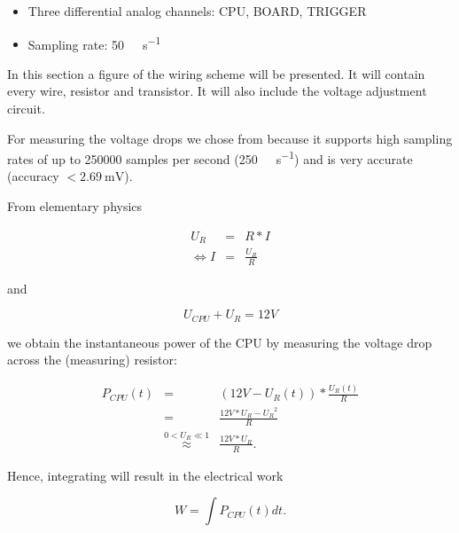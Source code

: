\begin{itemize}

\item Three differential analog channels: CPU, BOARD, TRIGGER

\item Sampling rate: \SI{50}{\kilo\samples\per\second}

\end{itemize}



In this section a figure of the wiring scheme will be presented. It will contain
every wire, resistor and transistor. It will also include the voltage adjustment
circuit.


\label{sec:measuring-device}

For measuring the voltage drops we chose
from  because it supports
high sampling rates of up to 250000 samples per second
(\SI{250}{\kilo\samples\per\second}) and is very
accurate (accuracy $< \SI{2.69}{\milli\volt}$)\cite{NISpec2009}.


\label{sec:calc-work}

From elementary physics

\begin{eqnarray}
     U_R & = & R * I \\
  \iff I & = & \frac{U_R}{R}
\end{eqnarray}

and

\begin{equation}
  U_{CPU} + U_{R} = 12 V
\end{equation}

we obtain the instantaneous power of the CPU by measuring the voltage drop
across the (measuring) resistor:

\begin{eqnarray}
P_{CPU}(t) & = & (12V - U_R(t)) * \frac{U_R(t)}{R} \\
           & = & \frac{12V * U_R - {U_R}^2}{R} \\
           & \stackrel{0 < U_R \ll 1}{\approx} & \frac{12V * U_R}{R}.
\end{eqnarray}

Hence, integrating will result in the electrical work

\begin{equation}
  W = \int P_{CPU}(t)dt.
\end{equation}

